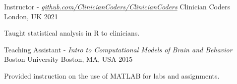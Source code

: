 %
%
%


\vspace*{0.4cm}

\begin{cventries}

    \cventry
        {Instructor - \textit{\href{https://github.com/ClinicianCoders/ClinicianCoders}{github.com/ClinicianCoders/ClinicianCoders}}}
        {Clinician Coders}
        {London, UK}
        {2021}
        {
            \begin{cvitems}
                \item Taught statistical analysis in R to clinicians.
            \end{cvitems}\vspace{1.5\baselineskip}
        }

    \vspace*{0.2cm}

    \cventry
        {Teaching Assistant - \textit{Intro to Computational Models of Brain and Behavior}}
        {Boston University}
        {Boston, MA, USA}
        {2015}
        {
            \begin{cvitems}
                \item Provided instruction on the use of MATLAB for labs and assignments.
            \end{cvitems}\vspace{1.5\baselineskip}
        }

\end{cventries}

\vspace*{-0.35cm}

